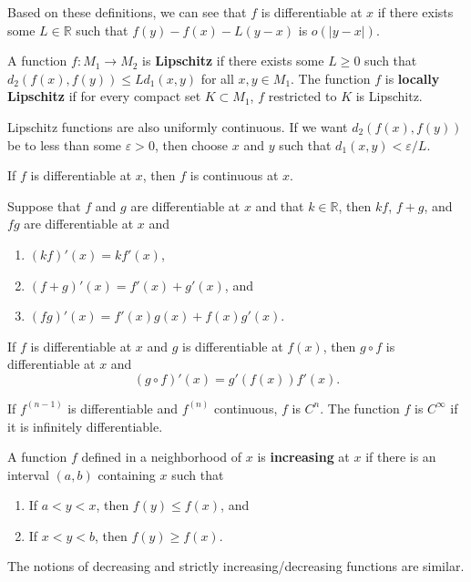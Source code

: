 \documentclass[twoside,10pt]{report}
\begin{document}
Based on these definitions, we can see that $f$ is differentiable at $x$ if there exists some $L \in \mathbb{R}$ such that $f(y)-f(x)-L(y-x)$ is $o(|y-x|)$.

\begin{defn}[]
	A function $f:M_1\to M_2$ is \textbf{Lipschitz} if there exists some $L \geq 0$ such that $d_2(f(x), f(y)) \leq L d_1(x,y)$ for all $x,y \in M_1$. The function $f$ is \textbf{locally Lipschitz} if for every compact set $K \subset M_1$, $f$ restricted to $K$ is Lipschitz.
\end{defn}

Lipschitz functions are also uniformly continuous. If we want $d_2(f(x),f(y))$ be to less than some $\varepsilon>0$, then choose $x$ and $y$ such that $d_1(x,y) < \varepsilon/L$.

\begin{prop}
	If $f$ is differentiable at $x$, then $f$ is continuous at $x$.
\end{prop}

\begin{thrm}{}{}
Suppose that $f$ and $g$ are differentiable at $x$ and that $k \in \mathbb{R}$, then $kf$, $f+g$, and $fg$ are differentiable at $x$ and
\begin{enumerate}
	\item $(kf)'(x) = kf'(x)$,
	\item $(f+g)'(x) = f'(x) + g'(x)$, and
	\item $(fg)'(x) = f'(x) g(x) + f(x) g'(x)$.
\end{enumerate}
\end{thrm}

\newpage
\begin{thrm}
	If $f$ is differentiable at $x$ and $g$ is differentiable at $f(x)$, then $g \circ f$ is differentiable at $x$ and
	\[
		(g \circ f)'(x) = g'(f(x)) f'(x).
	\] 
\end{thrm}

\begin{defn}[]
If $f^{(n-1)}$ is differentiable and $f^{(n)}$ continuous, $f$ is $C^{n}$. The function $f$ is $C^{\infty}$ if it is infinitely differentiable. 
\end{defn}

\begin{defn}[]
	A function $f$ defined in a neighborhood of $x$ is \textbf{increasing} at $x$ if there is an interval $(a,b)$ containing $x$ such that
	\begin{enumerate}
		\item If $a < y < x$, then $f(y) \leq f(x)$, and
		\item If $x < y < b$, then $f(y) \geq f(x)$.
	\end{enumerate}
	The notions of decreasing and strictly increasing/decreasing functions are similar.
\end{defn}
\end{document}
